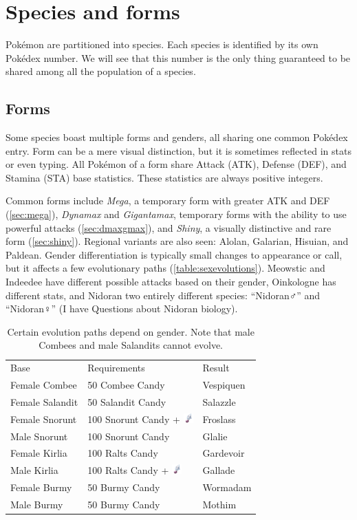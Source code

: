 \chapter{Species and forms\label{chap:species}}
Pokémon are partitioned into species.
Each species is identified by its own Pokédex number.
We will see that this number is the only thing guaranteed to be shared among all the population of a species.

\section{Forms\label{sec:forms}}
Some species boast multiple forms and genders, all sharing one common Pokédex entry.
Form can be a mere visual distinction, but it is sometimes reflected in stats or even typing.
All Pokémon of a form share Attack (ATK), Defense (DEF), and Stamina (STA) base statistics.
These statistics are always positive integers.

Common forms include \textit{Mega}, a temporary form with greater ATK and DEF (\autoref{sec:mega}),
  \textit{Dynamax} and \textit{Gigantamax}, temporary forms with the ability to use
  powerful attacks (\autoref{sec:dmaxgmax}),
  and \textit{Shiny}, a visually distinctive and rare form (\autoref{sec:shiny}).
Regional variants are also seen: Alolan, Galarian, Hisuian, and Paldean.
Gender differentiation is typically small changes to appearance or call,
 but it affects a few evolutionary paths (\autoref{table:sexevolutions}).
Meowstic and Indeedee have different possible attacks based on their gender,
 Oinkologne has different stats, and Nidoran two entirely different
 species: ``Nidoran♂'' and ``Nidoran♀'' (I have Questions about Nidoran biology).
\begin{table}
\footnotesize
\centering
\begin{tabular}{lll}
Base & Requirements & Result \\
\Midrule
Female Combee	& 50 Combee Candy & Vespiquen\\
Female Salandit & 50 Salandit Candy & Salazzle\\
Female Snorunt & 100 Snorunt Candy + \includegraphics[width=1em,height=1em]{images/sinnohstone.png} & Froslass\\
Male Snorunt & 100 Snorunt Candy & Glalie\\
Female Kirlia & 100 Ralts Candy & Gardevoir\\
Male Kirlia & 100 Ralts Candy + \includegraphics[width=1em,height=1em]{images/sinnohstone.png} & Gallade\\
Female Burmy & 50 Burmy Candy & Wormadam\\
Male Burmy & 50 Burmy Candy & Mothim\\
\end{tabular}
\caption[Gender-dependent evolutions]{Certain evolution paths depend on gender. Note that male Combees and male Salandits cannot evolve.\label{table:sexevolutions}}
\end{table}

